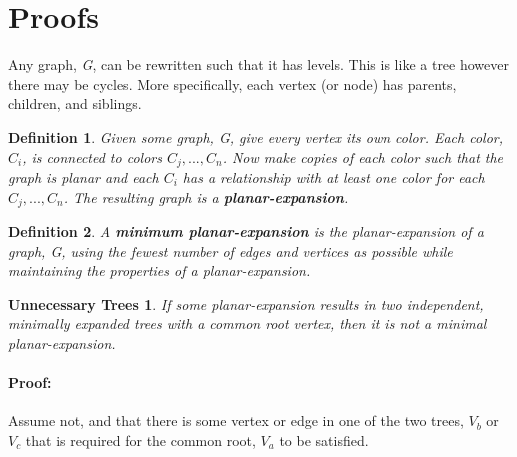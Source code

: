 \documentclass{article}
\newtheorem*{trees}{Unnecessary Trees}
\newtheorem{mydef}{Definition}
\begin{document}


\section{Proofs}
Any graph, \emph{G}, can be rewritten such that it has levels.  This is like a 
tree however there may be cycles.  More specifically, each vertex (or node) has
parents, children, and siblings.\\

\theoremstyle{definition}
\begin{mydef}
Given some graph, \emph{G}, give every vertex its own color. Each color, $C_i$, 
is connected to colors $C_{j},...,C_{n}$. Now make copies of
each color such that the graph is planar and each $C_i$ has a relationship with 
at least one color for each $C_{j},...,C_{n}$.  The resulting graph is a 
\textbf{planar-expansion}.\\
\end{mydef}

\theoremstyle{definition}
\begin{mydef}
A \textbf{minimum planar-expansion} is the planar-expansion of a graph, G, using
the fewest number of edges and vertices as possible while maintaining the 
properties of a planar-expansion.\\
\end{mydef}


\begin{trees}
If some planar-expansion results in two independent, minimally expanded trees 
with a common root vertex, then it is not a minimal planar-expansion.
\end{trees}
\paragraph{Proof: }
Assume not, and that there is some vertex or edge in one of the two trees, 
$V_b$ or $V_c$ that is required for the common root, $V_a$ to be satisfied.
\end{document}
